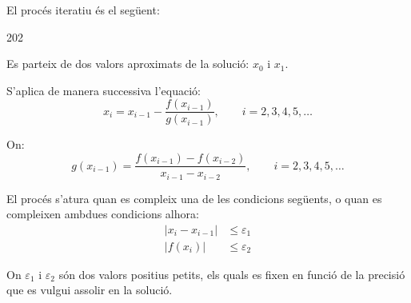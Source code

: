 \begin{center}
    
    \label{pic:metode-secant}
\end{center}


El procés iteratiu és el següent:

\begin{dingautolist}{202}
    \item Es parteix de dos valors aproximats de la solució: $x_0$ i $x_1$.

    \item   S'aplica de manera successiva l'equació:
            \begin{equation}\label{eq:secant-1}
              x_i = x_{i-1} - \frac{f(x_{i-1})}{g(x_{i-1})}, \qquad i=2,3,4,5, \dots
            \end{equation}

            On:
            \begin{equation}\label{eq:secant-2}
              g(x_{i-1}) = \frac{f(x_{i-1}) - f(x_{i-2}) } {x_{i-1} - x_{i-2}}, \qquad i=2,3,4, 5, \dots
            \end{equation}

    \item   El procés s'atura quan es compleix una de les condicions següents, o quan es compleixen ambdues condicions alhora:
            \begin{subequations}\begin{align}
              |x_i - x_{i-1}| &\leq \varepsilon_1 \\
              |f(x_i)| &\leq \varepsilon_2
            \end{align}\end{subequations}

            On $\varepsilon_1$ i $\varepsilon_2$ són dos valors positius petits, els quals es fixen en funció de la precisió que es vulgui assolir en la solució.
\end{dingautolist}


